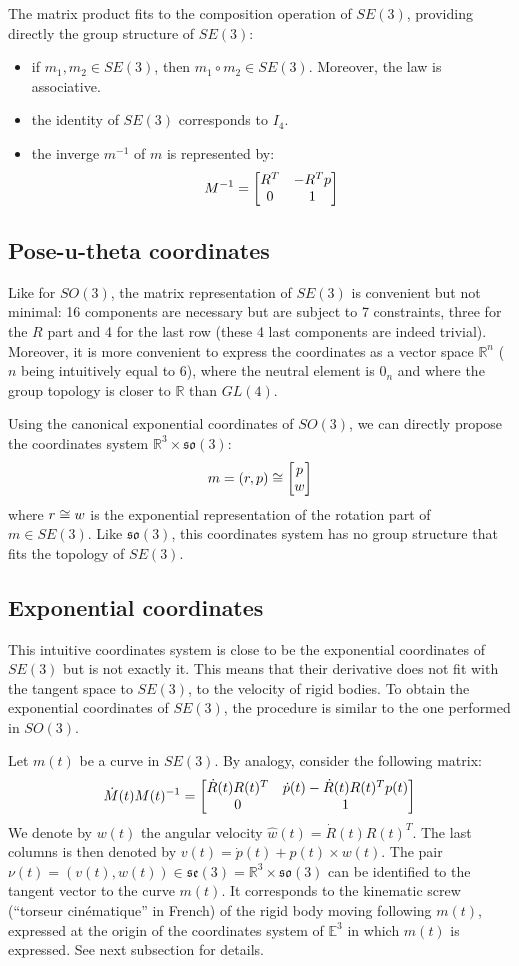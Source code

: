 \documentclass{book}
\begin{document}
The matrix product fits to the composition operation of $SE(3)$, providing directly the group structure of $SE(3)$:
\begin{itemize}
\item if $m_1,m_2 \in SE(3)$, then $m_1 \circ m_2 \in SE(3)$. Moreover, the law is associative.
\item the identity of $SE(3)$ corresponds to $I_4$.
\item the inverge $m^{-1}$ of $m$ is represented by:
\[ M^{-1} = \begin{bmatrix} R^T & -R^T p \\ 0 & 1 \end{bmatrix} \]
\end{itemize}

\subsection{Pose-u-theta coordinates}

Like for $SO(3)$, the matrix representation of $SE(3)$ is convenient but not minimal: 16 components are necessary but are subject to 7 constraints, three for the $R$ part and 4 for the last row (these 4 last components are indeed trivial). Moreover, it is more convenient to express the coordinates as a vector space $\mathbb{R}^n$ ($n$ being intuitively equal to 6), where the neutral element is $0_n$ and where the group topology is closer to $\mathbb{R}$ than $GL(4)$.

Using the canonical exponential coordinates of $SO(3)$, we can directly propose the coordinates system $\mathbb{R}^3 \times \mathfrak{so}(3)$:
\[ m = (r,p) \cong \begin{bmatrix} p \\ w \end{bmatrix} \]
where $r \cong w$ is the exponential representation of the rotation part of $m \in SE(3)$. Like $\mathfrak{so}(3)$, this coordinates system has no group structure that fits the topology of $SE(3)$.

\subsection{Exponential coordinates}

This intuitive coordinates system is close to be the exponential coordinates of $SE(3)$ but is not exactly it. This means that their derivative does not fit with the tangent space to $SE(3)$, \mie to the velocity of rigid bodies. To obtain the exponential coordinates of $SE(3)$, the procedure is similar to the one performed in $SO(3)$. 

Let $m(t)$ be a curve in $SE(3)$. By analogy, consider the following matrix:
\[ \dot{M}(t) M(t)^{-1} = \begin{bmatrix} \dot{R}(t) R(t)^T & \dot{p}(t) - \dot{R}(t) R(t)^T p(t) \\ 0&1 \end{bmatrix} \]
We denote by $w(t)$ the angular velocity $\hat{w}(t) = \dot{R}(t) R(t)^T$. The last columns is then denoted by $v(t) = \dot{p}(t) + p(t) \times w(t)$. The pair $\nu(t) = (v(t),w(t)) \in \mathfrak{se}(3) = \mathbb{R}^3 \times \mathfrak{so}(3)$ can be identified to the tangent vector to the curve $m(t)$. It corresponds to the kinematic screw (``torseur cin\'ematique'' in French) of the rigid body moving following $m(t)$, expressed at the origin of the coordinates system of $\mathbb{E}^3$ in which $m(t)$ is expressed. See next subsection for details.
\end{document}
